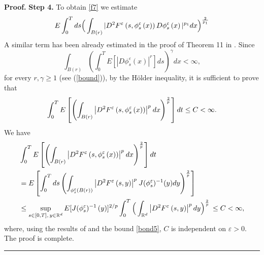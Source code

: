 \documentclass{article}
\newcommand{\eps}{\varepsilon}
\newcommand{\RR}{\mathbb{R}}
\newenvironment{proof}[1][Proof]{\noindent\textbf{#1.} }{\ \rule{0.5em}{0.5em}}
\begin{document}
\begin{proof}
\medskip \noindent \textbf{Step 4.}
 To obtain \eqref{f7} we estimate
\begin{equation*}
E\int_{0}^{T}ds\Big (\int_{B(r)}|D^{2}F^{\varepsilon }\left( s,{\phi}^{\varepsilon}_{s}\left( x\right) \right) D{\phi}^{\varepsilon}_{s}\left( x\right) |^{p_{1}}dx\Big )^{%
\frac{2}{p_{1}}}
\end{equation*}
A similar term has been already estimated in the proof of Theorem 11
in \cite{FGP}. Since
\begin{equation*}
\int_{B(r)}\left( \int_{0}^{T}E\left[ \left|
D{\phi}^{\varepsilon}_{s}\left( x\right) \right| ^{r}\right]
ds\right) ^{\gamma }dx<\infty ,
\end{equation*}
for every $r,\gamma \geq 1$ (see (\ref{bound})), by the H\"{o}lder
inequality, it is sufficient to prove that
\begin{equation*}
\int_{0}^{T}E\left[ \left( \int_{B(r)}\left| D^{2}F^{\varepsilon
}\left( s,{\phi}^{\varepsilon}_{s}
\left( x\right) \right) \right| ^{p^{}}dx\right) ^{\frac{2}{%
p^{ }}}\right] dt \le C <\infty.
\end{equation*}
  We have
\begin{align*}
& \int_{0}^{T}E\left[ \left( \int_{B(r)}\left| D^{2}F^{\varepsilon }
\left( s,
{\phi}^{\varepsilon}_{s}\left( x\right) \right) \right|^{p^{}}dx\right) ^{\frac{2}{%
p^{ }}}\right] dt \\
& =E\left[ \int_{0}^{T}ds\left(
\int_{{\phi}^{\varepsilon}_{s}(B(r))}\left| D^{2}F^{\varepsilon
}\left( s,{y}\right) \right|
^{p^{}}J({\phi}^{\varepsilon}_{s})^{-1}(y)dy\right) ^{\frac{2}{p^{ }}}\right]  \\
& \leq \sup_{s \in [0,T] , \, y \in \RR^d}
   E[ J (\phi_s^{\eps})^{-1}\, (y)]^{2/p}
\int_{0}^{T}\Big (\int_{\mathbb{R}^d}\left| D^{2}F^{\varepsilon
}\left( s,{y}\right) \right| ^{p}dy\Big )^{\frac{2}{p}}\, \le C <
\infty,
\end{align*}
where, using  the results of \cite[Section 3]{FGP} and the bound
\eqref{bond5}, $C$ is independent on $\eps>0.$ The proof  is
complete.
\end{proof}


\end{document}
